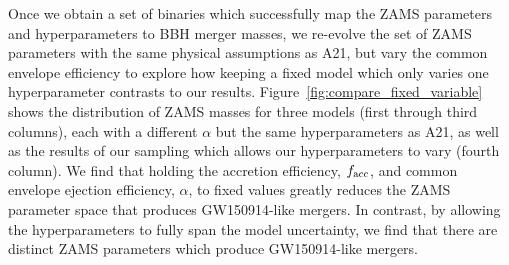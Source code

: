 \documentclass[twocolumn]{aastex631}
\begin{document}

Once we obtain a set of binaries which successfully map the ZAMS parameters and
hyperparameters to BBH merger masses, we re-evolve the set of ZAMS parameters
with the same physical assumptions as A21, but vary the common envelope
efficiency to explore how keeping a fixed model which only varies one
hyperparameter contrasts to our results. Figure~\ref{fig:compare_fixed_variable}
shows the distribution of ZAMS masses for three models (first through third
columns), each with a different $\alpha$ but the same hyperparameters as A21, as
well as the results of our sampling which allows our hyperparameters to vary
(fourth column). We find that holding the accretion efficiency, $f_{\rm{acc}}$,
and common envelope ejection efficiency, $\alpha$, to fixed values greatly
reduces the ZAMS parameter space that produces GW150914-like mergers. In
contrast, by allowing the hyperparameters to fully span the model uncertainty,
we find that there are distinct ZAMS parameters which produce GW150914-like
mergers.
\end{document}
